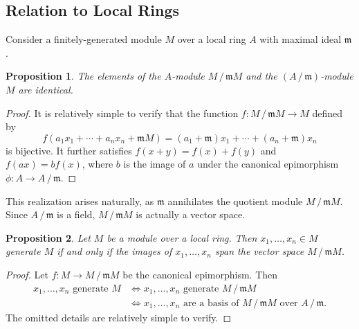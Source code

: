 \documentclass[11pt]{article}
\newtheorem{proposition}{Proposition}
\begin{document}

\subsection{Relation to Local Rings}

Consider a finitely-generated module $M$ over a local ring $A$ with maximal ideal $\mathfrak{m}$. 

\begin{adjustwidth}{0.5cm}{}
	\begin{proposition}
		The elements of the $A$-module $M \,/\, \mathfrak{m} M$ and the $(A \,/\, \mathfrak{m})$-module $M$ are identical.
	\end{proposition}
	\begin{proof}
		It is relatively simple to verify that the function $f : M \,/\, \mathfrak{m} M \to M$ defined by
		\[
			f(a_{1} x_{1} + \cdots + a_{n} x_{n} + \mathfrak{m}M) = (a_{1} + \mathfrak{m})x_{1} + \cdots + (a_{n} + \mathfrak{m})x_{n}
		\]
		is bijective. It further satisfies $f(x + y) = f(x) + f(y)$ and $f(ax) = b f(x)$, where $b$ is the image of $a$ under the canonical epimorphism $\phi : A \to A \,/\, \mathfrak{m}$.
	\end{proof}
\end{adjustwidth}

This realization arises naturally, as $\mathfrak{m}$ annihilates the quotient module $M \,/\, \mathfrak{m} M$. Since $A \,/\, \mathfrak{m}$ is a field, $M \,/\, \mathfrak{m} M$ is actually a vector space.

\begin{adjustwidth}{0.5cm}{}
	\begin{proposition}
		Let $M$ be a module over a local ring. Then $x_{1}, \ldots, x_{n} \in M$ generate $M$ if and only if the images of $x_{1}, \ldots, x_{n}$ span the vector space $M \,/\, \mathfrak{m} M$.
	\end{proposition}
	\begin{proof}
		Let $f : M \to M \,/\, \mathfrak{m} M$ be the canonical epimorphism. Then
		\begin{align*}
			\text{$x_{1}, \ldots, x_{n}$ generate $M$} &\iff \text{$x_{1}, \ldots, x_{n}$ generate $M \,/\, \mathfrak{m} M$} \\
			&\iff \text{$x_{1}, \ldots, x_{n}$ are a basis of $M \,/\, \mathfrak{m} M$ over $A \,/\, \mathfrak{m}$}.
		\end{align*}
		The omitted details are relatively simple to verify.
	\end{proof}
\end{adjustwidth}
\end{document}
